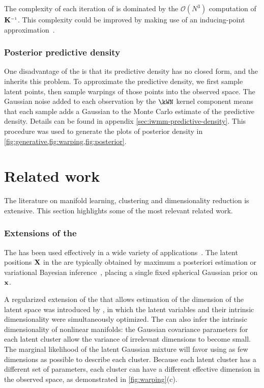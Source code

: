 The complexity of each iteration of \HMC{} is dominated by the $\mathcal{O}(N^3)$ computation of $\vK\inv$.
This complexity could be improved by making use of an inducing-point approximation~\citep{quinonero2005unifying,snelson2006sparse}.



\subsubsection{Posterior predictive density}

One disadvantage of the \gplvm{} is that its predictive density has no closed form, and the \iwmm{} inherits this problem.
To approximate the predictive density, we first sample latent points, then sample warpings of those points into the observed space. %
The Gaussian noise added to each observation by the $\kWN$ kernel component means that each sample adds a Gaussian to the Monte Carlo estimate of the predictive density.
Details can be found in appendix \ref{sec:iwmm-predictive-density}.
This procedure was used to generate the plots of posterior density in \cref{fig:generative,fig:warping,fig:posterior}.





\section{Related work}
\label{sec:iwmm-related-work}

The literature on manifold learning, clustering and dimensionality reduction is extensive.
This section highlights some of the most relevant related work.

\subsubsection{Extensions of the \sgplvm{}}

The \gplvm{} has been used effectively in a wide variety of applications~\citep{lawrence2004gaussian,salzmann2008local,lawrence2009non}.
The latent positions $\mathbf{X}$ in the \gplvm{} are typically obtained by maximum a posteriori estimation or variational Bayesian inference~\citep{titsias2010bayesian}, placing a single fixed spherical Gaussian prior on ${\bf{x}}$.

A regularized extension of the \gplvm{} that allows estimation of the dimension of the latent space was introduced by \citet{geiger2009rank}, in which the latent variables and their intrinsic dimensionality were simultaneously optimized.
The \iwmm{} can also infer the intrinsic dimensionality of nonlinear manifolds:
the Gaussian covariance parameters for each latent cluster allow the variance of irrelevant dimensions to become small.
The marginal likelihood of the latent Gaussian mixture will favor using as few dimensions as possible to describe each cluster.
Because each latent cluster has a different set of parameters, each cluster can have a different effective dimension in the observed space,
as demonstrated in \cref{fig:warping}(c).

